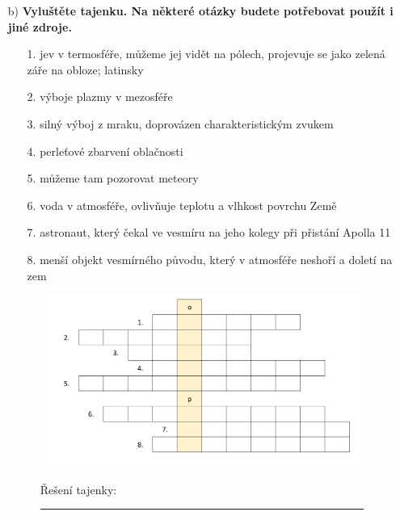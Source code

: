 \documentclass[11pt]{article}
\begin{document}
\begin{enumerate}
\begin{figure}[tbh!]
\begin{minipage}[b]{0.272\textwidth}
  \end{minipage}
   
\end{figure}


\rule{6cm}{0.05cm} \hspace{5cm} \rule{3.2cm}{0.05cm}

\item[b)]\textbf{Vyluštěte tajenku. Na některé otázky budete potřebovat použít i jiné zdroje.} 
\begin{small}


\begin{enumerate}
\item[1.] jev v termosféře, můžeme jej vidět na pólech, projevuje se jako zelená záře na obloze; latinsky 
\item[2.] výboje plazmy v mezosféře
\item[3.] silný výboj z mraku, doprovázen charakteristickým zvukem
\item[4.] perleťové zbarvení oblačnosti
\item[5.] můžeme tam pozorovat meteory
\item[6.] voda v atmosféře, ovlivňuje teplotu a vlhkost povrchu Země
\item[7.] astronaut, který čekal ve vesmíru na jeho kolegy při přistání Apolla 11
\item[8.] menší objekt vesmírného původu, který v atmosféře neshoří a doletí na zem

\end{enumerate}
\end{small}
\newpage
\begin{figure}[!tbh]
\begin{center}

    \includegraphics[scale=0.30]{resources/křížovka.png}
   
\end{center}
 {Řešení tajenky: }\rule{5cm}{0.05cm}
\end{figure}



\end{enumerate}
\end{document}
